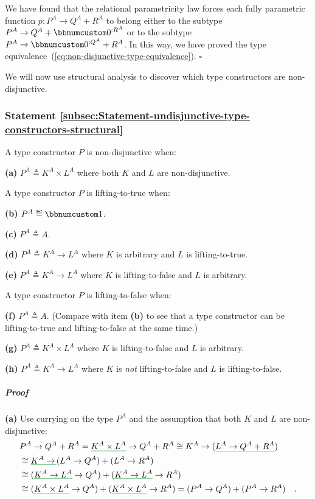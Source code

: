 We have found that the relational parametricity law forces each fully
parametric function $p:P^{A}\rightarrow Q^{A}+R^{A}$ to belong either
to the subtype $P^{A}\rightarrow Q^{A}+\bbnum 0^{:R^{A}}$ or to the
subtype $P^{A}\rightarrow\bbnum 0^{:Q^{A}}+R^{A}$. In this way, we
have proved the type equivalence~(\ref{eq:non-disjunctive-type-equivalence}).
$\square$

We will now use structural analysis to discover which type constructors
are non-disjunctive.

\subsubsection{Statement \label{subsec:Statement-undisjunctive-type-constructors-structural}\ref{subsec:Statement-undisjunctive-type-constructors-structural}}

A type constructor $P$ is non-disjunctive when:

\textbf{(a)} $P^{A}\triangleq K^{A}\times L^{A}$ where both $K$
and $L$ are non-disjunctive.

A type constructor $P$ is lifting-to-true when:

\textbf{(b)} $P^{A}\triangleq\bbnum 1$.

\textbf{(c)} $P^{A}\triangleq A$.

\textbf{(d)} $P^{A}\triangleq K^{A}\rightarrow L^{A}$ where $K$
is arbitrary and $L$ is lifting-to-true.

\textbf{(e)} $P^{A}\triangleq K^{A}\rightarrow L^{A}$ where $K$
is lifting-to-false and $L$ is arbitrary.

A type constructor $P$ is lifting-to-false when:

\textbf{(f)} $P^{A}\triangleq A$. (Compare with item \textbf{(b)}
to see that a type constructor can be lifting-to-true and lifting-to-false
at the same time.)

\textbf{(g)} $P^{A}\triangleq K^{A}\times L^{A}$ where $K$ is lifting-to-false
and $L$ is arbitrary.

\textbf{(h)} $P^{A}\triangleq K^{A}\rightarrow L^{A}$ where $K$
is \emph{not} lifting-to-false and $L$ is lifting-to-false.

\subparagraph{Proof}

\textbf{(a)} Use currying on the type $P^{A}$ and the assumption
that both $K$ and $L$ are non-disjunctive:
\begin{align*}
 & P^{A}\rightarrow Q^{A}+R^{A}=\gunderline{K^{A}\times L^{A}}\rightarrow Q^{A}+R^{A}\cong K^{A}\rightarrow(\gunderline{L^{A}\rightarrow Q^{A}+R^{A}})\\
 & \cong\gunderline{K^{A}\rightarrow\,}(L^{A}\rightarrow Q^{A})+(L^{A}\rightarrow R^{A})\\
 & \cong(\gunderline{K^{A}\rightarrow L^{A}}\rightarrow Q^{A})+(\gunderline{K^{A}\rightarrow L^{A}}\rightarrow R^{A})\\
 & \cong(\gunderline{K^{A}\times L^{A}}\rightarrow Q^{A})+(\gunderline{K^{A}\times L^{A}}\rightarrow R^{A})=(P^{A}\rightarrow Q^{A})+(P^{A}\rightarrow R^{A})\quad.
\end{align*}

